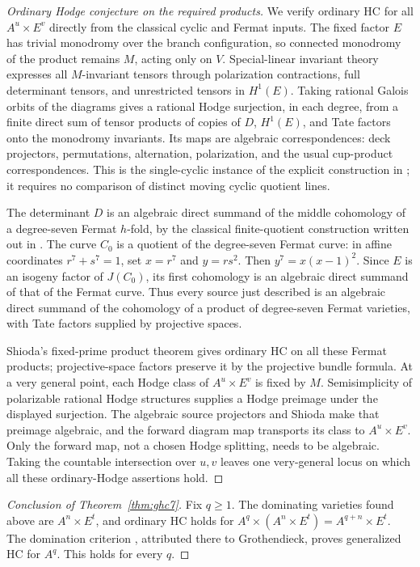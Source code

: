 \documentclass[11pt]{article}
\theoremstyle{definition}
\begin{document}
\begin{proof}[Ordinary Hodge conjecture on the required products]
We verify ordinary HC for all $A^u\times E^v$ directly from the
classical cyclic and Fermat inputs. The fixed factor $E$ has trivial
monodromy over the branch configuration, so connected monodromy of
the product remains $M$, acting only on $V$.
Special-linear invariant theory expresses all $M$-invariant tensors
through polarization contractions, full determinant tensors, and
unrestricted tensors in $H^1(E)$. Taking rational Galois orbits of
the diagrams gives a rational Hodge surjection, in each degree,
from a finite direct sum of tensor products of copies of $D$,
$H^1(E)$, and Tate factors onto the monodromy invariants.
Its maps are algebraic correspondences: deck projectors, permutations,
alternation, polarization, and the usual cup-product correspondences.
This is the single-cyclic instance of the explicit construction in
\cite[Section 5]{General}; it requires no comparison of distinct
moving cyclic quotient lines.

The determinant $D$ is an algebraic direct summand of the middle
cohomology of a degree-seven Fermat $h$-fold, by the classical
finite-quotient construction written out in
\cite[Theorem 1.1]{Fermat}. The curve $C_0$ is a quotient of the
degree-seven Fermat curve: in affine coordinates $r^7+s^7=1$, set
$x=r^7$ and $y=rs^2$. Then $y^7=x(x-1)^2$.
Since $E$ is an isogeny factor of $J(C_0)$, its first cohomology is
an algebraic direct summand of that of the Fermat curve. Thus every
source just described is an algebraic direct summand of the
cohomology of a product of degree-seven Fermat varieties, with
Tate factors supplied by projective spaces.

Shioda's fixed-prime product theorem \cite[Theorem 2]{Shioda79}
gives ordinary HC on all these Fermat products; projective-space
factors preserve it by the projective bundle formula. At a very
general point, each Hodge class of $A^u\times E^v$ is fixed by $M$.
Semisimplicity of polarizable rational Hodge structures supplies a
Hodge preimage under the displayed surjection. The algebraic source
projectors and Shioda make that preimage algebraic, and the forward
diagram map transports its class to $A^u\times E^v$.
Only the forward map, not a chosen Hodge splitting, needs to be
algebraic. Taking the countable intersection over $u,v$ leaves one
very-general locus on which all these ordinary-Hodge assertions hold.
\end{proof}

\begin{proof}[Conclusion of Theorem~\ref{thm:ghc7}]
Fix $q\geq1$. The dominating varieties found above are
$A^n\times E^t$, and ordinary HC holds for
$A^q\times(A^n\times E^t)=A^{q+n}\times E^t$.
The domination criterion \cite[Proposition 1]{Abdulali12}, attributed
there to Grothendieck, proves generalized HC for $A^q$.
This holds for every $q$.
\end{proof}
\end{document}
